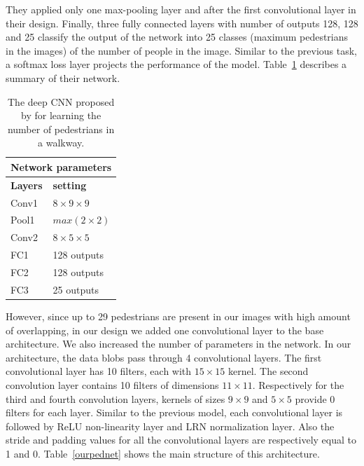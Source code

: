 They applied only one max-pooling layer and after the first convolutional layer in their design. Finally, three fully connected layers with number of outputs 128, 128 and 25 classify the output of the network into 25 classes (maximum pedestrians in the images) of the number of people in the image. Similar to the previous task, a softmax loss layer projects the performance of the model.   
Table~\ref{santiarch} describes a summary of their network.

\begin{table}[H]
	\centering
	\begin{tabular}{ |p{2cm}|p{2cm}| }
	\hline 
	\multicolumn{2}{|c|}{\textbf{Network parameters}} \\
	\hline
	\hline
	\textbf{Layers} & \textbf{setting }\\
	\hline
	Conv1 & $8\times9\times9$\\
	\hline
	Pool1    & $max(2\times2)$ \\
	\hline
	Conv2 & $8\times5\times5$\\
	\hline
	FC1 & 128 outputs \\
	\hline
	FC2 & 128 outputs \\
	\hline
	FC3 & 25 outputs \\
	\hline
	\end{tabular}
		\caption{The deep CNN proposed by \citealt{segui2015learning} for learning the number of pedestrians in a walkway.}
		\label{santiarch}
\end{table}


\noindent However, since up to 29 pedestrians are present in our images with high amount of overlapping, in our design we added one convolutional layer to the base architecture. We also increased the number of parameters in the network. In our architecture, the data blobs pass through 4 convolutional layers. The first convolutional layer has 10 filters, each with $15\times15$ kernel. The second convolution layer contains 10 filters of dimensions $11\times11$. Respectively for the third and fourth convolution layers, kernels of sizes $9\times9$ and $5\times5$  provide 0 filters for each layer. Similar to the previous model, each convolutional layer is followed by ReLU non-linearity layer and LRN normalization layer. Also the stride and padding values for all the convolutional layers are respectively equal to 1 and 0. Table~\ref{ourpednet} shows the main structure of this architecture. 

